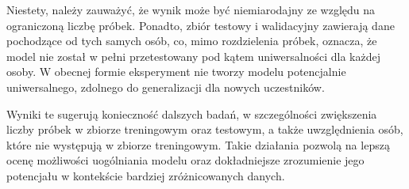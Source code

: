 \documentclass[eeg_v4.tex]{subfiles}
\begin{document}
    Niestety, należy zauważyć, że wynik może być niemiarodajny ze względu na ograniczoną liczbę próbek. Ponadto, zbiór
    testowy i walidacyjny zawierają dane pochodzące od tych samych osób, co, mimo rozdzielenia próbek, oznacza, że model
    nie został w pełni przetestowany pod kątem uniwersalności dla każdej osoby. W obecnej formie eksperyment nie tworzy
    modelu potencjalnie uniwersalnego, zdolnego do generalizacji dla nowych uczestników.

    Wyniki te sugerują konieczność dalszych badań, w szczególności zwiększenia liczby próbek w zbiorze treningowym oraz
    testowym, a także uwzględnienia osób, które nie występują w zbiorze treningowym. Takie działania pozwolą na lepszą
    ocenę możliwości uogólniania modelu oraz dokładniejsze zrozumienie jego potencjału w kontekście bardziej
    zróżnicowanych danych.
\end{document}
